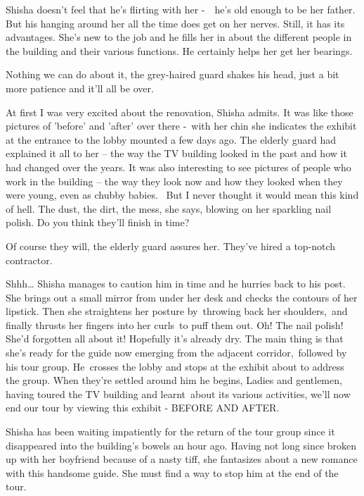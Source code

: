 \documentclass[twoside,11pt]{book}
\begin{document}
Shisha doesn't feel that he's flirting with her -\ \ he's old enough to be her father. But his hanging around her all
the time does get on her nerves. Still, it has its advantages. She's new to the job and he fills her in about the
different people in the building and their various functions. He certainly helps her get her bearings.\ 

{\textquotedbl}Nothing we can do about it,{\textquotedbl} the grey-haired guard shakes his head, {\textquotedbl}just a
bit more patience and it'll all be over.{\textquotedbl} ~

{\textquotedbl}At first I was very excited about the renovation,{\textquotedbl} Shisha admits. {\textquotedbl}It was
like those pictures of 'before' and 'after' over there -{\textquotedbl}~with her chin she indicates the exhibit at the
entrance to the lobby mounted a few days ago. The elderly guard had explained it all to her -- the way the TV building
looked in the past and how it had changed over the years. It was also interesting to see pictures of people who work in
the building -- the way they look now and how they looked when they were young, even as chubby babies.
~{\textquotedbl}But I never thought it would mean this kind of hell. The dust, the dirt, the mess,{\textquotedbl} she
says, blowing on her sparkling nail polish. {\textquotedbl}Do you think they'll finish in time?{\textquotedbl} 

{\textquotedbl}Of course they will,{\textquotedbl} the elderly guard assures her. {\textquotedbl}They've hired a
top-notch contractor.{\textquotedbl}

{\textquotedbl}Shhh{\dots}{\textquotedbl} Shisha manages to caution him in time and he hurries back to his post. She
brings out a small mirror from under her desk and checks the contours of her lipstick. Then she straightens her posture
by{\ }throwing back her shoulders,\ and finally thrusts her fingers into her curls~to puff them out. Oh!
The nail polish! She'd forgotten all about it! Hopefully it's already dry. The main thing is that she's ready for the
guide now emerging from the adjacent corridor,~followed by his tour group. He~crosses the lobby and stops at the
exhibit about to address the group. When they're settled around him he begins, {\textquotedbl}Ladies and gentlemen,
having toured the TV building and learnt\ about its various activities, we'll now end our tour by viewing this exhibit
- BEFORE AND AFTER.{\textquotedbl}\ 

Shisha has been waiting impatiently for the return of the tour group since it disappeared into the building's bowels an
hour ago. Having not long since broken up with her boyfriend because of a nasty tiff, she fantasizes about a new
romance with this handsome guide. She must find a way to stop him at the end of the tour. 
\end{document}
